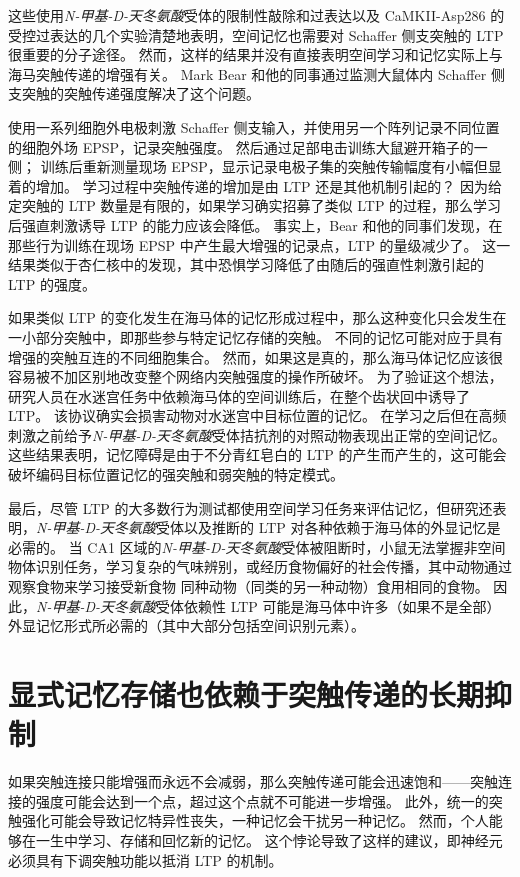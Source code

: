 这些使用\textit{N-甲基-D-天冬氨酸}受体的限制性敲除和过表达以及 CaMKII-Asp286 的受控过表达的几个实验清楚地表明，空间记忆也需要对 Schaffer 侧支突触的 LTP 很重要的分子途径。
然而，这样的结果并没有直接表明空间学习和记忆实际上与海马突触传递的增强有关。
Mark Bear 和他的同事通过监测大鼠体内 Schaffer 侧支突触的突触传递强度解决了这个问题。


使用一系列细胞外电极刺激 Schaffer 侧支输入，并使用另一个阵列记录不同位置的细胞外场 EPSP，记录突触强度。
然后通过足部电击训练大鼠避开箱子的一侧；
训练后重新测量现场 EPSP，显示记录电极子集的突触传输幅度有小幅但显着的增加。
学习过程中突触传递的增加是由 LTP 还是其他机制引起的？
因为给定突触的 LTP 数量是有限的，如果学习确实招募了类似 LTP 的过程，那么学习后强直刺激诱导 LTP 的能力应该会降低。
事实上，Bear 和他的同事们发现，在那些行为训练在现场 EPSP 中产生最大增强的记录点，LTP 的量级减少了。
这一结果类似于杏仁核中的发现，其中恐惧学习降低了由随后的强直性刺激引起的 LTP 的强度。


如果类似 LTP 的变化发生在海马体的记忆形成过程中，那么这种变化只会发生在一小部分突触中，即那些参与特定记忆存储的突触。
不同的记忆可能对应于具有增强的突触互连的不同细胞集合。
然而，如果这是真的，那么海马体记忆应该很容易被不加区别地改变整个网络内突触强度的操作所破坏。
为了验证这个想法，研究人员在水迷宫任务中依赖海马体的空间训练后，在整个齿状回中诱导了 LTP。
该协议确实会损害动物对水迷宫中目标位置的记忆。
在学习之后但在高频刺激之前给予\textit{N-甲基-D-天冬氨酸}受体拮抗剂的对照动物表现出正常的空间记忆。
这些结果表明，记忆障碍是由于不分青红皂白的 LTP 的产生而产生的，这可能会破坏编码目标位置记忆的强突触和弱突触的特定模式。


最后，尽管 LTP 的大多数行为测试都使用空间学习任务来评估记忆，但研究还表明，\textit{N-甲基-D-天冬氨酸}受体以及推断的 LTP 对各种依赖于海马体的外显记忆是必需的。
当 CA1 区域的\textit{N-甲基-D-天冬氨酸}受体被阻断时，小鼠无法掌握非空间物体识别任务，学习复杂的气味辨别，或经历食物偏好的社会传播，其中动物通过观察食物来学习接受新食物 同种动物（同类的另一种动物）食用相同的食物。
因此，\textit{N-甲基-D-天冬氨酸}受体依赖性 LTP 可能是海马体中许多（如果不是全部）外显记忆形式所必需的（其中大部分包括空间识别元素）。



\section{显式记忆存储也依赖于突触传递的长期抑制}

如果突触连接只能增强而永远不会减弱，那么突触传递可能会迅速饱和——突触连接的强度可能会达到一个点，超过这个点就不可能进一步增强。
此外，统一的突触强化可能会导致记忆特异性丧失，一种记忆会干扰另一种记忆。
然而，个人能够在一生中学习、存储和回忆新的记忆。
这个悖论导致了这样的建议，即神经元必须具有下调突触功能以抵消 LTP 的机制。


